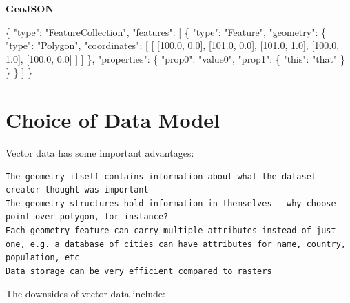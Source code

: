 \documentclass[
]{book}
\newenvironment{Shaded}{\begin{snugshade}}{\end{snugshade}}
\newcommand{\DataTypeTok}[1]{\textcolor[rgb]{0.13,0.29,0.53}{#1}}
\newcommand{\FloatTok}[1]{\textcolor[rgb]{0.00,0.00,0.81}{#1}}
\newcommand{\FunctionTok}[1]{\textcolor[rgb]{0.00,0.00,0.00}{#1}}
\newcommand{\OtherTok}[1]{\textcolor[rgb]{0.56,0.35,0.01}{#1}}
\newcommand{\StringTok}[1]{\textcolor[rgb]{0.31,0.60,0.02}{#1}}
\begin{document}
\textbf{GeoJSON}

\begin{Shaded}
\begin{Highlighting}[]
\FunctionTok{\{}
  \DataTypeTok{"type"}\FunctionTok{:} \StringTok{"FeatureCollection"}\FunctionTok{,}
  \DataTypeTok{"features"}\FunctionTok{:} \OtherTok{[}
    \FunctionTok{\{}
      \DataTypeTok{"type"}\FunctionTok{:} \StringTok{"Feature"}\FunctionTok{,}
      \DataTypeTok{"geometry"}\FunctionTok{:} \FunctionTok{\{}
        \DataTypeTok{"type"}\FunctionTok{:} \StringTok{"Polygon"}\FunctionTok{,}
        \DataTypeTok{"coordinates"}\FunctionTok{:} \OtherTok{[}
          \OtherTok{[}
            \OtherTok{[}\FloatTok{100.0}\OtherTok{,} \FloatTok{0.0}\OtherTok{],} \OtherTok{[}\FloatTok{101.0}\OtherTok{,} \FloatTok{0.0}\OtherTok{],} \OtherTok{[}\FloatTok{101.0}\OtherTok{,} \FloatTok{1.0}\OtherTok{],}
            \OtherTok{[}\FloatTok{100.0}\OtherTok{,} \FloatTok{1.0}\OtherTok{],} \OtherTok{[}\FloatTok{100.0}\OtherTok{,} \FloatTok{0.0}\OtherTok{]}
          \OtherTok{]}
        \OtherTok{]}
      \FunctionTok{\},}
      \DataTypeTok{"properties"}\FunctionTok{:} \FunctionTok{\{}
        \DataTypeTok{"prop0"}\FunctionTok{:} \StringTok{"value0"}\FunctionTok{,}
        \DataTypeTok{"prop1"}\FunctionTok{:} \FunctionTok{\{} \DataTypeTok{"this"}\FunctionTok{:} \StringTok{"that"} \FunctionTok{\}}
      \FunctionTok{\}}
    \FunctionTok{\}}
  \OtherTok{]}
\FunctionTok{\}}
\end{Highlighting}
\end{Shaded}

\hypertarget{choice-of-data-model}{%
\section{Choice of Data Model}\label{choice-of-data-model}}

Vector data has some important advantages:

\begin{verbatim}
The geometry itself contains information about what the dataset creator thought was important
The geometry structures hold information in themselves - why choose point over polygon, for instance?
Each geometry feature can carry multiple attributes instead of just one, e.g. a database of cities can have attributes for name, country, population, etc
Data storage can be very efficient compared to rasters
\end{verbatim}

The downsides of vector data include:
\end{document}
